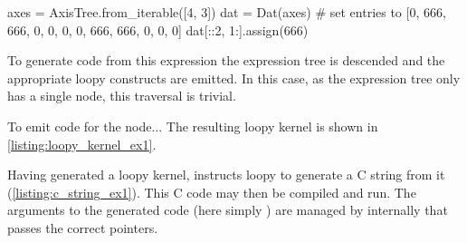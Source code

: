 \documentclass[thesis]{subfiles}
\begin{document}
\begin{example}


\begin{pyinline}
  axes = AxisTree.from_iterable([4, 3])
  dat = Dat(axes)
  # set entries to [0, 666, 666, 0, 0, 0, 0, 666, 666, 0, 0, 0]
  dat[::2, 1:].assign(666)
\end{pyinline}



To generate code from this expression the expression tree is descended and the appropriate loopy constructs are emitted.
In this case, as the expression tree only has a single node, this traversal is trivial.

To emit code for the  node...
The resulting loopy kernel is shown in \cref{listing:loopy_kernel_ex1}.

Having generated a loopy kernel,  instructs loopy to generate a C string from it (\cref{listing:c_string_ex1}).
This C code may then be compiled and run.
The arguments to the generated code (here simply ) are managed by  internally that passes the correct pointers.


\end{example}
\end{document}
